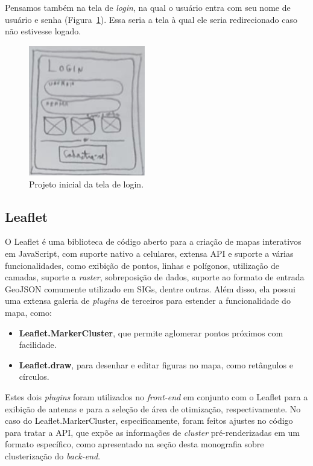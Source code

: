 \documentclass[]{politex}
\begin{document}
Pensamos também na tela de \textit{login}, na qual o usuário entra com seu nome
de usuário e senha (Figura~\ref{fig:rascunho_login}). Essa seria a tela à qual
ele seria redirecionado caso não estivesse logado.

\begin{figure}[H]
    \centering
    \includegraphics[width=2in]{imagens/rascunho-login}
    \caption{Projeto inicial da tela de login.}
    \label{fig:rascunho_login}
\end{figure}

\subsection{Leaflet}

O Leaflet é uma biblioteca de código aberto para a criação de mapas interativos
em JavaScript, com suporte nativo a celulares, extensa API e suporte a várias
funcionalidades, como exibição de pontos, linhas e polígonos, utilização de
camadas, suporte a \textit{raster}, sobreposição de dados, suporte ao formato de
entrada GeoJSON comumente utilizado em SIGs, dentre outras. Além disso, ela
possui uma extensa galeria de \textit{plugins} de terceiros para estender a
funcionalidade do mapa, como:

\begin{itemize}
\item \textbf{Leaflet.MarkerCluster}, que permite aglomerar pontos próximos com
facilidade.
\item \textbf{Leaflet.draw}, para desenhar e editar figuras no mapa, como
retângulos e círculos.
\end{itemize}

Estes dois \textit{plugins} foram utilizados no \textit{front-end} em conjunto
com o Leaflet para a exibição de antenas e para a seleção de área de otimização,
respectivamente. No caso do Leaflet.MarkerCluster, especificamente, foram feitos
ajustes no código para tratar a API, que expõe as informações de
\textit{cluster} pré-renderizadas em um formato específico, como apresentado na
seção desta monografia sobre clusterização do \textit{back-end}.
\end{document}
